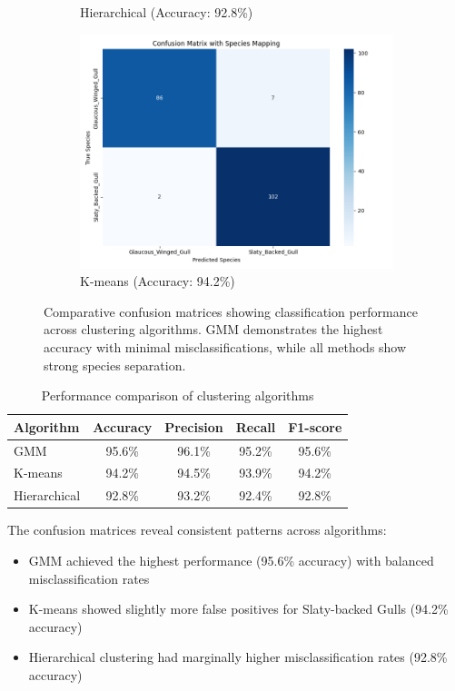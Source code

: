 \documentclass[a4paper,12pt]{report}
\begin{document}
\begin{figure}[htbp]
\begin{subfigure}[b]{0.32\textwidth}
        \caption{Hierarchical (Accuracy: 92.8\%)}
        \label{fig:hierarchical_cm}
    \end{subfigure}
    \hfill
    \begin{subfigure}[b]{0.32\textwidth}
        \centering
        \includegraphics[width=\textwidth]{images/clustering/kmeans_confusion_matrix.png}
        \caption{K-means (Accuracy: 94.2\%)}
        \label{fig:kmeans_cm}
    \end{subfigure}
    \caption{Comparative confusion matrices showing classification performance across clustering algorithms. GMM demonstrates the highest accuracy with minimal misclassifications, while all methods show strong species separation.}
    \label{fig:all_confusion_matrices}
\end{figure}

\begin{table}[htbp]
\centering
\caption{Performance comparison of clustering algorithms}
\label{tab:performance_summary}
\begin{tabular}{lcccc}
\toprule
Algorithm & Accuracy & Precision & Recall & F1-score \\
\midrule
GMM & 95.6\% & 96.1\% & 95.2\% & 95.6\% \\
K-means & 94.2\% & 94.5\% & 93.9\% & 94.2\% \\
Hierarchical & 92.8\% & 93.2\% & 92.4\% & 92.8\% \\
\bottomrule
\end{tabular}
\end{table}

The confusion matrices reveal consistent patterns across algorithms:
\begin{itemize}
    \item GMM achieved the highest performance (95.6\% accuracy) with balanced misclassification rates
    \item K-means showed slightly more false positives for Slaty-backed Gulls (94.2\% accuracy)
    \item Hierarchical clustering had marginally higher misclassification rates (92.8\% accuracy)
\end{itemize}
\end{document}
